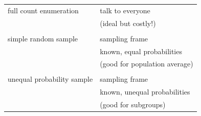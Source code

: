 \documentclass{beamer}
\begin{document}
\begin{frame}
\centering
\begin{tabular}{ll}
full count enumeration & talk to everyone \\ & (ideal but costly!) \\ \\
simple random sample & sampling frame \\ & known, equal probabilities \\ & (good for population average) \\ \\
unequal probability sample & sampling frame \\ & known, unequal probabilities \\ & (good for subgroups)
\end{tabular}
\end{frame}
\end{document}
